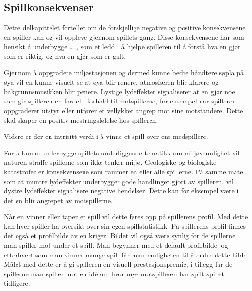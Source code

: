 \subsection{Spillkonsekvenser}
Dette delkapittelet forteller om de forskjellige negative og positive
konsekvensene en spiller kan og vil oppleve gjennom spillets gang. Disse konsekvensene har som hensikt å underbygge …
, som et ledd i å hjelpe spilleren til å forstå hva en gjør som er riktig, og hva en gjør som er galt.

Gjennom å oppgradere miljøstasjonen og dermed kunne bedre håndtere søpla på øya vil en kunne visuelt se at øya blir renere, atmosfæren blir klarere og bakgrunnsmusikken blir penere. Lystige lydeffekter signaliserer at en gjør noe som gir spilleren en fordel i forhold til motspillerne, for eksempel når spilleren oppgraderer utstyr eller utfører et vellykket angrep mot sine
motstandere. Dette skal skaper en positiv mestringsfølelse hos spilleren. 

Videre er der en intrisitt verdi i å vinne et spill over ens
medspillere.

For å kunne underbygge spillets underliggende tematikk om
miljøvennlighet vil naturen straffe spillerne som ikke tenker miljø.
Geologiske og biologiske katastrofer er konsekvensene som rammer en
eller alle spillerne.
På samme måte som at muntre lydeffekter underbygger gode handlinger
gjort av spilleren, vil dystre lydeffekter signalisere negative
hendelser. Dette kan for eksempel være i det en blir angrepet av
motspillerne. 

Når en vinner eller taper et spill vil dette føres opp på spillerens
profil. Med dette kan hver spiller ha oversikt over sin egen
spillstatistikk. På spillerens profil finnes det også et profilbilde av
en kriger. Bildet vil også være synlig for de spillerne man spiller mot
under et spill. Man begynner med et default profilbilde, og etterhvert
som man vinner mange spill får man muligheten til å endre dette bilde.
Målet med dette er å gi spilleren en visuell prestasjonspremie, i
tillegg får de spillerne man spiller mot en idè om hvor mye motspilleren
har spilt spillet tidligere.



